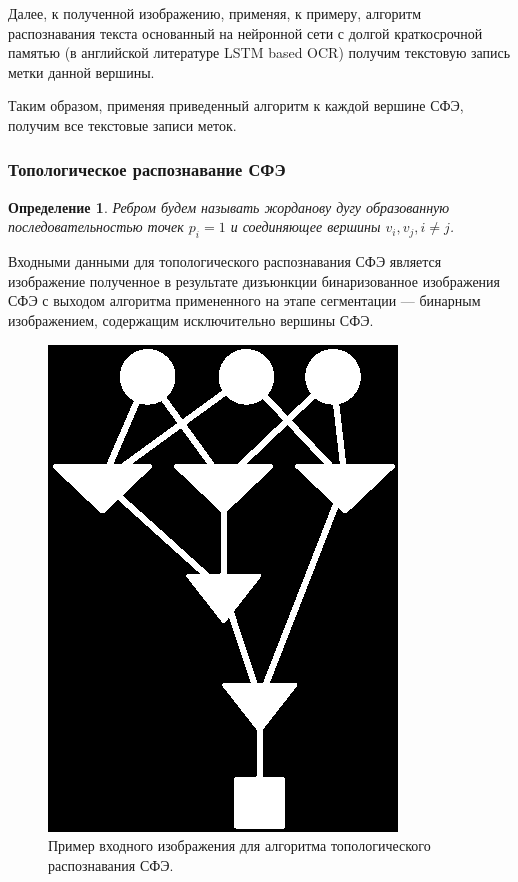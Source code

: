 \documentclass[makeidx, a4paper, 14pt]{extarticle}
\newtheorem{definition}{Определение}
\begin{document}
Далее, к полученной изображению, применяя, к примеру, алгоритм распознавания текста основанный на нейронной сети с долгой краткосрочной памятью (в английской литературе LSTM based OCR) \cite{adnan16, tesseract}
получим текстовую запись метки данной вершины.

Таким образом, применяя приведенный алгоритм к каждой вершине СФЭ, получим все текстовые записи меток.

\subsubsection{Топологическое распознавание СФЭ}

\begin{definition}
    Ребром будем называть жорданову дугу образованную последовательностью точек ${p_i=1}$
    и соединяющее вершины ${v_i, v_j, i \neq j}$.
\end{definition}


Входными данными для топологического распознавания СФЭ является изображение полученное в результате дизъюнкции бинаризованное изображения СФЭ
с выходом алгоритма примененного на этапе сегментации --- бинарным изображением, содержащим исключительно вершины СФЭ.

\begin{figure}[H]
    \centering
    \includegraphics[scale=0.75]{img4_binarized_bfd.png}
    \caption{Пример входного изображения для алгоритма топологического распознавания СФЭ.}
    \label{fig:bfd}
\end{figure}
\end{document}
